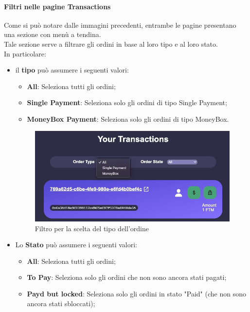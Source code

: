         \paragraph{Filtri nelle pagine Transactions}
        Come si può notare dalle immagini precedenti, entrambe le pagine presentano una sezione con menù a tendina.\\
        Tale sezione serve a filtrare gli ordini in base al loro tipo e al loro stato.\\
        In particolare:
        \begin{itemize}
            \item il \textbf{tipo} può assumere i seguenti valori:
            \begin{itemize}
                \item \textbf{All}: Seleziona tutti gli ordini;
                \item \textbf{Single Payment}: Seleziona solo gli ordini di tipo Single Payment;
                \item \textbf{MoneyBox Payment}: Seleziona solo gli ordini di tipo MoneyBox.
            \end{itemize}
            \begin{figure}[H]
                \centering
                \includegraphics[scale=0.4]{immagini/Transaction/ordertype.jpg}
            \caption{Filtro per la scelta del tipo dell'ordine}
            \end{figure}
            \item Lo \textbf{Stato} può assumere i seguenti valori:
            \begin{itemize}
                \item \textbf{All}: Seleziona tutti gli ordini;
                \item \textbf{To Pay}: Seleziona solo gli ordini che non sono ancora stati pagati;
                \item \textbf{Payd but locked}: Seleziona solo gli ordini in stato "Paid" (che non sono ancora stati sbloccati);

\end{itemize}
\end{itemize}
